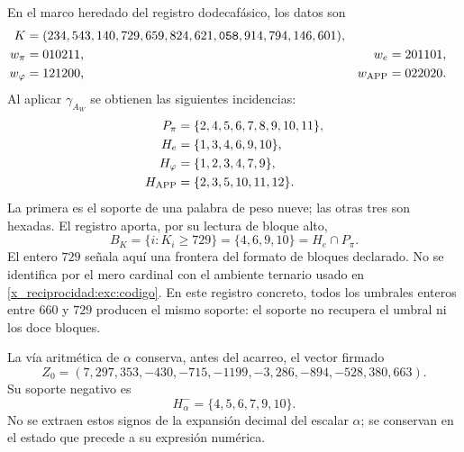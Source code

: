En el marco heredado del registro dodecafásico, los datos son
\begin{align}
 K={}&(234,543,140,729,659,824,621,\mathtt{058},914,794,146,601),
 \label{x_reciprocidad:exc:k}\\
 w_\pi={}&010211, &w_e={}&201101,\nonumber\\
 w_\varphi={}&121200, &w_{\rm APP}={}&022020.\nonumber
\end{align}
Al aplicar $\gamma_{A_W}$ se obtienen las siguientes incidencias:
\begin{align*}
 P_\pi&=\{2,4,5,6,7,8,9,10,11\},\\
 H_e&=\{1,3,4,6,9,10\},\\
 H_\varphi&=\{1,2,3,4,7,9\},\\
 H_{\rm APP}&=\{2,3,5,10,11,12\}.
\end{align*}
La primera es el soporte de una palabra de peso nueve; las otras tres
son hexadas. El registro aporta, por su lectura de bloque alto,
\begin{equation}
 B_K=\{i:K_i\geq729\}=\{4,6,9,10\}=H_e\cap P_\pi.
 \label{x_reciprocidad:exc:bk}
\end{equation}
El entero $729$ señala aquí una frontera del formato de bloques
declarado. No se identifica por el mero cardinal con el ambiente
ternario usado en \eqref{x_reciprocidad:exc:codigo}. En este registro concreto, todos
los umbrales enteros entre $660$ y $729$ producen el mismo soporte:
el soporte no recupera el umbral ni los doce bloques.

La vía aritmética de $\alpha$ conserva, antes del acarreo, el vector
firmado
\begin{equation}
 Z_0=(7,297,353,-430,-715,-1199,-3,286,-894,-528,380,663).
 \label{x_reciprocidad:exc:precarry}
\end{equation}
Su soporte negativo es
\begin{equation}
 H^-_\alpha=\{4,5,6,7,9,10\}.
 \label{x_reciprocidad:exc:halpha}
\end{equation}
No se extraen estos signos de la expansión decimal del escalar
$\alpha$; se conservan en el estado que precede a su expresión numérica.


